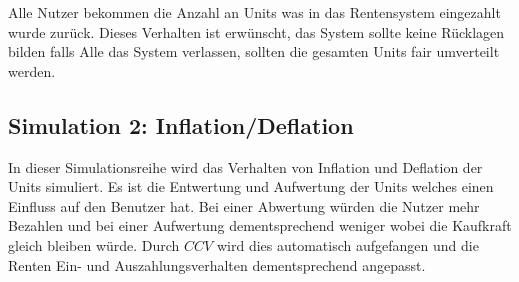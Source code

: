 \begin{table}[hbt!]
\centering
{}
\end{table}

\begin{table}[hbt!]
\centering
{}
\end{table}

Alle Nutzer bekommen die Anzahl an Units was in das Rentensystem eingezahlt wurde zurück. Dieses Verhalten ist erwünscht, das System sollte keine Rücklagen bilden falls Alle das System verlassen, sollten die gesamten Units fair umverteilt werden.

\subsection{Simulation 2: Inflation/Deflation}

In dieser Simulationsreihe wird das Verhalten von Inflation und Deflation der Units simuliert. Es ist die Entwertung und Aufwertung der Units welches einen Einfluss auf den Benutzer hat. Bei einer Abwertung würden die Nutzer mehr Bezahlen und bei einer Aufwertung dementsprechend weniger wobei die Kaufkraft gleich bleiben würde. Durch $CCV$ wird dies automatisch aufgefangen und die Renten Ein- und Auszahlungsverhalten dementsprechend angepasst. \\


